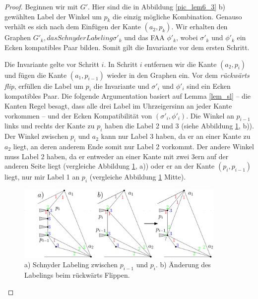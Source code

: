 \begin{proof}
Beginnen wir mit $G'$. Hier sind die in Abbildung \ref{pic_lem6_3} b) gewählten Label der Winkel um $p_k$ die einzig mögliche Kombination. Genauso verhält es sich nach dem Einfügen der Kante $(a_2,p_k)$. Wir erhalten den Graphen $G'_{k}, das Schnyder Labeling \sigma'_{k}$ und das FAA $\phi'_{k}$, wobei $\sigma'_{k}$ und $\phi'_{k}$ ein Ecken kompatibles Paar bilden. Somit gilt die Invariante vor dem ersten Schritt.

Die Invariante gelte vor Schritt $i$. In Schritt $i$ entfernen wir die Kante $(a_2,p_i)$ und fügen die Kante $(a_1,p_{i-1})$ wieder in den Graphen ein. Vor dem \textit{rückwärts flip}, erfüllen die Label um $p_i$ die Invariante und $\sigma'_{i}$ und $\phi'_{i}$ sind ein Ecken kompatibles Paar. Die folgende Argumentation basiert auf Lemma \ref{lem_sl} -- die Kanten Regel besagt, dass alle drei Label im Uhrzeigersinn an jeder Kante vorkommen -- und der Ecken Kompatibilität von $(\sigma'_{i},\phi'_{i})$. Die Winkel an $p_{i-1}$ links und rechts der Kante zu $p_i$ haben die Label 2 und 3 (siehe Abbildung \ref{pic_lem6_4}, b)). Der Winkel zwischen $p_i$ und $a_2$ kann nur Label 3 haben, da er an einer Kante zu $a_2$ liegt, an deren anderem Ende somit nur Label 2 vorkommt. Der andere Winkel muss Label 2 haben, da er entweder an einer Kante mit zwei 3ern auf der anderen Seite liegt (vergleiche Abbildung \ref{pic_lem6_4}, a)) oder er an der Kante $(p_i,p_{i-1})$ liegt, nur mir Label 1 an $p_i$ (vergleiche Abbildung \ref{pic_lem6_4} Mitte). 

\begin{figure}
	\centering
	  \includegraphics[width=0.9\textwidth]{lem6_4.png}
    	\caption{a) Schnyder Labeling zwischen $p_{i-1}$ und $p_{i}$. b) Änderung des Labelings beim rückwärts Flippen.}
    	\label{pic_lem6_4}
\end{figure}


\end{proof}
